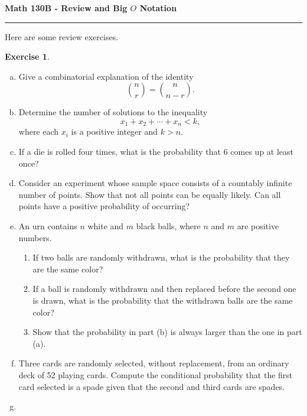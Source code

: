 \documentclass[11pt,letterpaper]{report}
\theoremstyle{definition}
\newtheorem{exercise}{Exercise}
\begin{document}
\begin{center}
{\bf \Large Math 130B - Review and Big $O$ Notation}
\vspace{0.2cm}
\hrule
\end{center}

Here are some review exercises.
\begin{exercise}
	\begin{enumerate}[(a)]
		\item Give a combinatorial explanation of the identity
		\[
		\binom{n}{r} = \binom{n}{n-r}.
		\]

		\item Determine the number of solutions to the inequality 
		\[
		x_1 + x_2 + \cdots + x_n < k,
		\]
		where each $x_i$ is a positive integer and $k> n$.

		\item If a die is rolled four times, what is the probability that 6 comes up at least once?

		\item Consider an experiment whose sample space consists of a countably infinite number of points. Show that not all points can be equally likely. Can all points have a positive probability of occurring?

		\item An urn contains $n$ white and $m$ black balls, where $n$ and $m$ are positive numbers.
		\begin{enumerate}
		 	\item If two balls are randomly withdrawn, what is the probability that they are the same color?
		 	\item If a ball is randomly withdrawn and then replaced before the second one is drawn, what is the probability that the withdrawn balls are the same color?
		 	\item Show that the probability in part (b) is always larger than the one in part (a).
		\end{enumerate} 


		\item Three cards are randomly selected, without replacement, from an ordinary deck of 52 playing cards. Compute the conditional probability that the first card selected is a spade given that the second and third cards are spades.

		\item 
	\end{enumerate}
\end{exercise}
\end{document}
